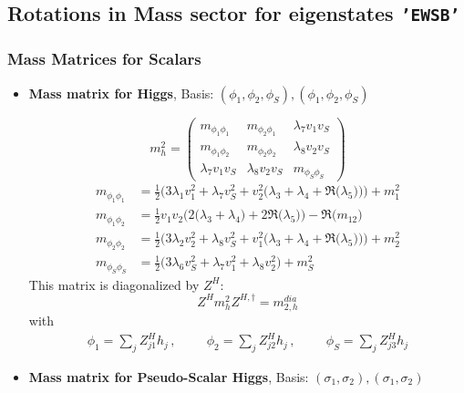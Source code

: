 \subsection{Rotations in Mass sector for eigenstates {\tt 'EWSB'} } 
\subsubsection{Mass Matrices for Scalars}
\begin{itemize} 
\item {\bf Mass matrix for Higgs}, Basis: \( \left(\phi_1, \phi_2, \phi_S\right), \left(\phi_1, \phi_2, \phi_S\right) \) 
 
\begin{equation} 
m^2_{h} = \left( 
\begin{array}{ccc}
m_{\phi_1\phi_1} &m_{\phi_2\phi_1} &\lambda_7 v_1 v_S \\ 
m_{\phi_1\phi_2} &m_{\phi_2\phi_2} &\lambda_8 v_2 v_S \\ 
\lambda_7 v_1 v_S  &\lambda_8 v_2 v_S  &m_{\phi_S\phi_S}\end{array} 
\right) 
 \end{equation} 
\begin{align} 
m_{\phi_1\phi_1} &= \frac{1}{2} \Big(3 \lambda_1 v_{1}^{2}  + \lambda_7 v_{S}^{2}  + v_{2}^{2} \Big(\lambda_3 + \lambda_4 + {\Re\Big(\lambda_5\Big)}\Big)\Big) + m^2_1\\ 
m_{\phi_1\phi_2} &= \frac{1}{2} v_1 v_2 \Big(2 \Big(\lambda_3 + \lambda_4\Big) + 2 {\Re\Big(\lambda_5\Big)} \Big) - {\Re\Big(m_{12}\Big)} \\ 
m_{\phi_2\phi_2} &= \frac{1}{2} \Big(3 \lambda_2 v_{2}^{2}  + \lambda_8 v_{S}^{2}  + v_{1}^{2} \Big(\lambda_3 + \lambda_4 + {\Re\Big(\lambda_5\Big)}\Big)\Big) + m^2_2\\ 
m_{\phi_S\phi_S} &= \frac{1}{2} \Big(3 \lambda_6 v_{S}^{2}  + \lambda_7 v_{1}^{2}  + \lambda_8 v_{2}^{2} \Big) + m_S^2
\end{align} 
This matrix is diagonalized by \(Z^H\): 
\begin{equation} 
Z^H m^2_{h} Z^{H,\dagger} = m^{dia}_{2,h} 
\end{equation} 
with 
\begin{align} 
\phi_1 = \sum_{j}Z_{{j 1}}^{H}h_{{j}}\,, \hspace{1cm} 
\phi_2 = \sum_{j}Z_{{j 2}}^{H}h_{{j}}\,, \hspace{1cm} 
\phi_S = \sum_{j}Z_{{j 3}}^{H}h_{{j}}
\end{align} 
\item {\bf Mass matrix for Pseudo-Scalar Higgs}, Basis: \( \left(\sigma_1, \sigma_2\right), \left(\sigma_1, \sigma_2\right) \) 
 

\end{itemize}
